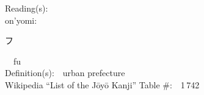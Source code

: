 \begin{multicols}{2}
Reading(s):\ \ \\
{\hspace*{1em}}on'yomi:\ \ \\
{\hspace*{2em}}{\begin{CJK}{UTF8}{min} フ \end{CJK}}\ \ fu\ \ \\
Definition(s):\ \ urban prefecture \\
Wikipedia ``List of the J\=oy\=o Kanji'' Table \#:\ \ 1\,742 \\
\ \ \\
\end{multicols}



